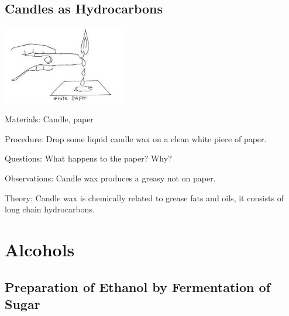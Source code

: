 \begin{multicols}{2}
\vfill
\columnbreak

\subsection{Candles as Hydrocarbons}

\begin{center}
\includegraphics[width=0.4\textwidth]{./img/source/candle-hydrocarbon.jpg}
\end{center}

\begin{description*}
\item[Materials:]{Candle, paper}
\item[Procedure:]{Drop some liquid candle wax on a clean
white piece of paper.}
\item[Questions:]{What happens to the paper? Why?}
\item[Observations:]{Candle wax produces a greasy not on paper.}
\item[Theory:]{Candle wax is chemically related to grease
fats and oils, it consists of long chain
hydrocarbons.}
\end{description*}


\section*{Alcohols}


\subsection{Preparation of Ethanol by Fermentation of Sugar}



\end{multicols}
